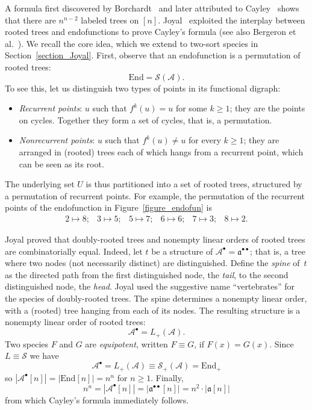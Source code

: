 \documentclass[a4paper,11pt,UKenglish]{article}
\newcommand{\Lin}{L}
\newcommand{\Sym}{\mathcal{S}}
\newcommand{\End}{\mathrm{End}}
\newcommand{\rtree}{\mathcal{A}}
\newcommand{\tree}{\mathfrak{a}}
\theoremstyle{definition}
\begin{document}
A formula first discovered by Borchardt~\cite{Bor} and later attributed
to Cayley~\cite{Cay} shows that there are $n^{n-2}$ labeled trees
on $[n]$. Joyal~\cite{J} exploited the interplay between rooted trees
and endofunctions to prove Cayley's formula (see also Bergeron et al.~\cite[Section~2.1]{BLL}).
We recall the core idea, which we extend to two-sort species in
Section~\ref{section_Joyal}.
First, observe that an
endofunction is a permutation of rooted trees:
\begin{equation}\label{eq_end=permrtree}
\End=\Sym(\rtree).
\end{equation}
To see this, let us distinguish two types of points in its functional
digraph:
%
\begin{itemize}
\item \emph{Recurrent points}: $u$ such that $f^k(u)=u$ for some
  $k\ge 1$; they are the points on cycles. Together they form
  a set of cycles, that is, a permutation.
\item \emph{Nonrecurrent points}: $u$ such that $f^k(u)\neq u$ for every
  $k\ge 1$; they are arranged in (rooted) trees each of which hangs from
  a recurrent point, which can be seen as its root.
\end{itemize}
%
The underlying set $U$ is thus partitioned into a set of rooted trees,
structured by a permutation of recurrent points. For example, the
permutation of the recurrent points of the endofunction in
Figure~\ref{figure_endofun} is
\[
\begin{array}{llllll}
  2\mapsto 8;&
  3\mapsto 5;&
  5\mapsto 7;&
  6\mapsto 6;&
  7\mapsto 3;&
  8\mapsto 2.
\end{array}
\]

Joyal proved that doubly-rooted trees and nonempty linear
orders of rooted trees are combinatorially equal. Indeed, let $t$ be a
structure of $\rtree^{\bullet}=\tree^{\bullet\bullet}$; that is,
a tree where two nodes (not necessarily distinct) are distinguished.
Define the \emph{spine} of~$t$ as the directed path from the first
distinguished node, the \emph{tail}, to the second distinguished node, the
\emph{head}. Joyal used the suggestive name ``vertebrates''
for the species of doubly-rooted trees.
The spine determines a nonempty linear order, with a (rooted) tree
hanging from each of its nodes. The resulting structure is a
nonempty linear order of rooted trees:
\[\rtree^{\bullet}=\Lin_+(\rtree).
\]
Two species $F$ and $G$ are \emph{equipotent}, written $F\equiv G$, if $F(x)=G(x)$.
Since $\Lin\equiv\Sym$ we have
\[
\rtree^{\bullet}=\Lin_+(\rtree)\equiv\Sym_+(\rtree)=\End_+
\]
so $|\rtree^{\bullet}[n]|=|\End[n]|=n^n$ for $n\ge 1$. Finally,
$$
n^n=|\rtree^{\bullet}[n]|=|\tree^{\bullet\bullet}[n]|=n^2\cdot|\tree[n]|
$$
from which Cayley's formula immediately follows.
\end{document}

